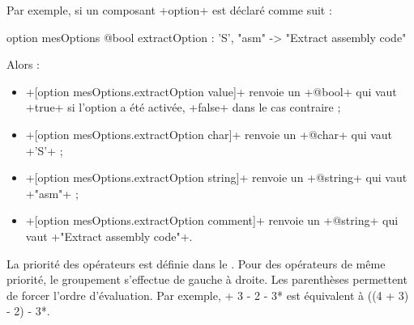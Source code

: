 {Par exemple, si un composant \ggs+option+ est déclaré comme suit :
\begin{galgas}
option mesOptions {
  @bool extractOption : 'S', "asm" -> "Extract assembly code"
}
\end{galgas}

Alors :
\begin{itemize}
  \item \ggs+[option mesOptions.extractOption value]+ renvoie un \ggs+@bool+ qui vaut \ggs+true+ si l'option a été activée, \ggs+false+ dans le cas contraire ;
  \item \ggs+[option mesOptions.extractOption char]+ renvoie un \ggs+@char+ qui vaut \ggs+'S'+ ;
  \item \ggs+[option mesOptions.extractOption string]+ renvoie un \ggs+@string+ qui vaut \ggs+"asm"+ ;
  \item \ggs+[option mesOptions.extractOption comment]+ renvoie un \ggs+@string+ qui vaut \ggs+"Extract assembly code"+.
\end{itemize}








La priorité des opérateurs est définie dans le . Pour des opérateurs de même priorité, le groupement s'effectue de gauche à droite. Les parenthèses permettent de forcer l'ordre d'évaluation. Par exemple,  + 3 - 2 - 3* est équivalent à \ggs*((4 + 3) - 2) - 3*.

}
